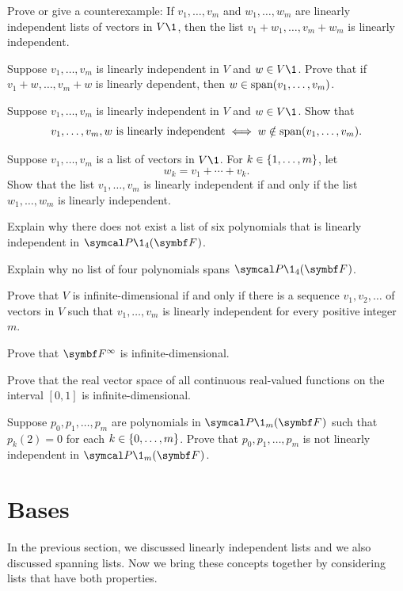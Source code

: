 \begin{exercises}
\exercise
Prove or give a counterexample: If $v_1, \dots, v_m$ and $w_1, \dots, w_m$ are linearly independent lists of vectors in $V\1$, then the list $v_1 + w_1, \dots, v_m + w_m$ is linearly independent.


\exercise
Suppose $v_1, \dots, v_m$ is linearly independent in $V$ and $w \in V\1$.  Prove that
if $v_1 + w, \dots, v_m + w$
is linearly dependent, then $w \in \operatorname{span}(v_1, \dots, v_m)$.


\exercise
Suppose $v_1, \dots, v_m$ is linearly independent in $V$ and $w \in V\1$. Show that
\[
v_1, \dots, v_m, w \text{ is linearly independent} \iff w \notin \operatorname{span} (v_1, \dots, v_m).
\]
\exercisedisplayend


\exercise
Suppose $v_1, \ldots, v_m$ is a list of vectors in $V\1$. For $k \in \{1, \ldots, m\}$, let\label{2ind}
\[
w_k = v_1 + \cdots + v_k.
\]
Show that the list $v_1, \ldots, v_m$ is linearly independent if and only if the list $w_1, \ldots, w_m$ is linearly independent.


\exercise
Explain why there does not exist a list of six polynomials that is linearly independent in $\P\1_4(\F{})$.


\exercise
Explain why no list of four polynomials spans $\P\1_4(\F{})$.


\exercise
Prove that $V$ is infinite-dimensional if and only if there is a
sequence $v_1, v_2, \dots$ of vectors in $V$ such that $v_1, \dots, v_m$ is
linearly independent for every positive integer $m$.\label{2infdim}


\exercise
Prove that $\F{\infty}$ is infinite-dimensional.


\exercise
Prove that the real vector space of all continuous real-valued
functions on the interval $[0, 1]$ is infinite-dimensional.


\exercise
Suppose $p_0, p_1, \dots, p_m$ are polynomials in $\P\1_m(\F{})$ such that
$p_k(2) = 0$ for each $k \in \{0, \ldots, m\}$.  Prove that $p_0, p_1, \dots, p_m$ is not linearly
independent in $\P\1_m(\F{})$.


\end{exercises}

\CrCom

\section{Bases}

In the previous section, we discussed linearly independent lists and we also discussed spanning lists. Now we bring these concepts together by considering lists that have both properties.

